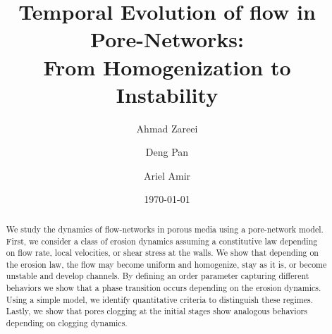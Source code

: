 \documentclass[%
 reprint,
 amsmath,amssymb,
 aps,
]{revtex4-1}
\begin{document}
%

\title{Temporal Evolution of flow in Pore-Networks:\\ From Homogenization to Instability} 

\author{Ahmad Zareei}
\author{Deng Pan}%
\author{Ariel Amir}%



\date{\today}%

\begin{abstract}
We study the dynamics of flow-networks in porous media using a pore-network model. First, we consider a class of erosion dynamics assuming a constitutive law depending on flow rate, local velocities, or shear stress at the walls. We show that depending on the erosion law, the flow may become uniform and homogenize, stay as it is, or become unstable and develop channels. By defining an order parameter capturing different behaviors we show that a phase transition occurs depending on the erosion dynamics. Using a simple model, we identify quantitative criteria to distinguish these regimes. Lastly, we show that pores clogging at the initial stages show analogous behaviors depending on clogging dynamics. %

\end{abstract}
\end{document}
